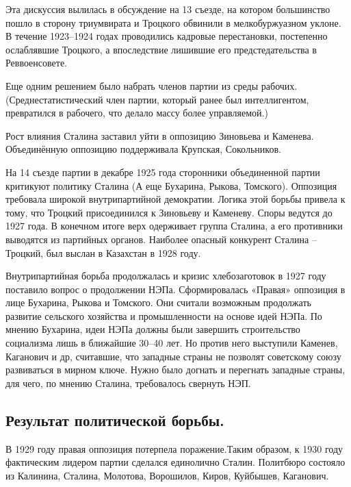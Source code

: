 Эта дискуссия вылилась в обсуждение на 13 съезде, на котором большинство пошло в сторону триумвирата и Троцкого обвинили в мелкобуржуазном уклоне. В течение 1923--1924 годах проводились кадровые перестановки, постепенно ослаблявшие Троцкого, а впоследствие лишившие его предстедательства в Реввоенсовете. 

Еще одним решением было набрать членов партии из среды рабочих. (Среднестатистический член партии, который ранее был интеллигентом, превратился в рабочего, что делало массу более управляемой.)

Рост влияния Сталина заставил уйти в оппозицию Зиновьева и Каменева. Объединённую оппозицию поддерживала Крупская, Сокольников.

На 14 съезде партии в декабре 1925 года сторонники объединенной партии критикуют политику Сталина (А еще Бухарина, Рыкова, Томского). Оппозиция требовала широкой внутрипартийной демократии. Логика этой борьбы привела к тому, что Троцкий присоединился к Зиновьеву и Каменеву. Споры ведутся до 1927 года. В конечном итоге верх одерживает группа Сталина, а его противники выводятся из партийных органов. Наиболее опасный конкурент Сталина – Троцкий, был выслан в Казахстан в 1928 году.

Внутрипартийная борьба продолжалась и кризис хлебозаготовок в 1927 году поставило вопрос о продолжении НЭПа. Сформировалась «Правая» оппозиция в лице Бухарина, Рыкова и Томского. Они считали возможным продолжать развитие сельского хозяйства и промышленности на основе идей НЭПа. По мнению Бухарина, идеи НЭПа должны были завершить строительство социализма лишь в ближайшие 30--40 лет. Но против него выступили Каменев, Каганович и др, считавшие, что западные страны не позволят советскому союзу развиваться в мирном ключе. Нужно было догнать и перегнать западные страны, для чего, по мнению Сталина, требовалось свернуть НЭП. 

\subsection{Результат политической борьбы.}

В 1929 году правая оппозиция потерпела поражение.Таким образом, к 1930 году фактическим лидером партии сделался единолично Сталин. Политбюро состояло из Калинина, Сталина, Молотова, Ворошилов, Киров, Куйбышев, Каганович.